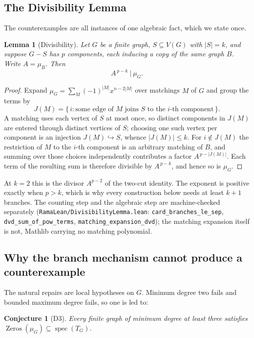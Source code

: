 \documentclass[11pt]{article}
\newtheorem{lemma}[theorem]{Lemma}
\newtheorem{conjecture}[theorem]{Conjecture}
\theoremstyle{remark}
\begin{document}
\subsection{The Divisibility Lemma}\label{sec:divis}

The counterexamples are all instances of one algebraic fact, which we state once.

\begin{lemma}[Divisibility]\label{lem:divis}
Let $G$ be a finite graph, $S\subseteq V(G)$ with $|S|=k$, and suppose $G-S$ has $p$ components,
each inducing a copy of the same graph $B$. Write $A=\mu_B$. Then
\[
  A^{\,p-k}\ \big|\ \mu_G .
\]
\end{lemma}

\begin{proof}
Expand $\mu_G=\sum_M(-1)^{|M|}x^{n-2|M|}$ over matchings $M$ of $G$ and group the terms by
\[
  J(M)=\{\,i : \text{some edge of $M$ joins $S$ to the $i$-th component}\,\}.
\]
A matching uses each vertex of $S$ at most once, so distinct components in $J(M)$ are entered
through distinct vertices of $S$; choosing one such vertex per component is an injection
$J(M)\hookrightarrow S$, whence $|J(M)|\le k$. For $i\notin J(M)$ the restriction of $M$ to the
$i$-th component is an arbitrary matching of $B$, and summing over those choices independently
contributes a factor $A^{\,p-|J(M)|}$. Each term of the resulting sum is therefore divisible by
$A^{\,p-k}$, and hence so is $\mu_G$.
\end{proof}

At $k=2$ this is the divisor $A^{p-2}$ of the two-cut identity. The exponent is positive exactly
when $p>k$, which is why every construction below needs at least $k+1$ branches. The counting step
and the algebraic step are machine-checked separately
(\texttt{RamaLean/DivisibilityLemma.lean}: \texttt{card\_branches\_le\_sep},
\texttt{dvd\_sum\_of\_pow\_terms}, \texttt{matching\_expansion\_dvd}); the matching expansion
itself is not, Mathlib carrying no matching polynomial.

\subsection{Why the branch mechanism cannot produce a counterexample}\label{sec:mindeg3}

The natural repairs are local hypotheses on $G$. Minimum degree two fails and bounded maximum degree
fails, so one is led to:

\begin{conjecture}[D3]\label{conj:mindeg3}
Every finite graph of minimum degree at least three satisfies
$\operatorname{Zeros}(\mu_G)\subseteq\operatorname{spec}(T_G)$.
\end{conjecture}
\end{document}
